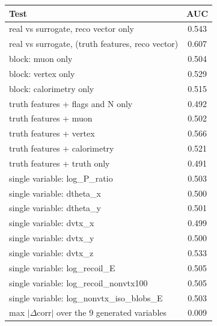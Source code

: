 \begin{tabular}{lc}
\toprule
Test & AUC \\
\midrule
real vs surrogate, reco vector only & 0.543 \\
real vs surrogate, (truth features, reco vector) & 0.607 \\
\midrule
block: muon only & 0.504 \\
block: vertex only & 0.529 \\
block: calorimetry only & 0.515 \\
truth features + flags and N only & 0.492 \\
truth features + muon & 0.502 \\
truth features + vertex & 0.566 \\
truth features + calorimetry & 0.521 \\
truth features + truth only & 0.491 \\
single variable: log\_P\_ratio & 0.503 \\
single variable: dtheta\_x & 0.500 \\
single variable: dtheta\_y & 0.501 \\
single variable: dvtx\_x & 0.499 \\
single variable: dvtx\_y & 0.500 \\
single variable: dvtx\_z & 0.533 \\
single variable: log\_recoil\_E & 0.505 \\
single variable: log\_recoil\_nonvtx100 & 0.505 \\
single variable: log\_nonvtx\_iso\_blobs\_E & 0.503 \\
\midrule
max $|\Delta$corr$|$ over the 9 generated variables & 0.009 \\
\bottomrule
\end{tabular}
